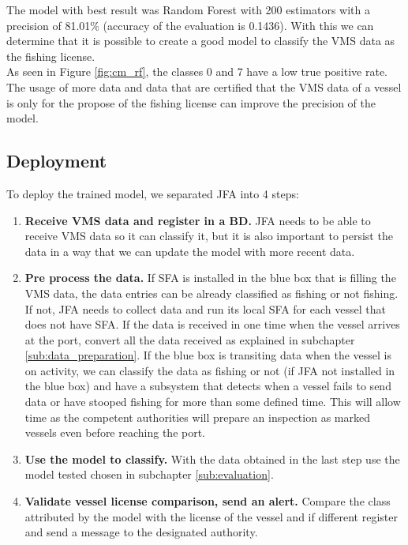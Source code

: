\newpage
The model with best result was Random Forest with 200 estimators with a precision of 81.01\% (accuracy of the evaluation is 0.1436).
With this we can determine that it is possible to create a good model to classify the VMS data as the fishing license. \\
As seen in Figure \ref{fig:cm_rf}, the classes 0 and 7 have a low true positive rate. The usage of more data and data that are certified that the VMS data of a vessel is only for the propose of the fishing license can improve the precision of the model.





\subsection{Deployment} %
\label{sub:deployment}

To deploy the trained model, we separated JFA into 4 steps:
\begin{enumerate}
\item \textbf{ Receive VMS data and register in a BD.} JFA needs to be able to receive VMS data so it can classify it, but it is also important to persist the data in a way that we can update the model with more recent data. 

\item \textbf{Pre process the data.} If SFA is installed in the blue box that is filling the VMS data, the data entries can be already classified as fishing or not fishing. If not, JFA needs to collect data and run its local SFA for each vessel that does not have SFA. If the data is received in one time when the vessel arrives at the port, convert all the data received as explained in subchapter \ref{sub:data_preparation}. If the blue box is transiting data when the vessel is on activity, we can classify the data as fishing or not (if JFA not installed in the blue box) and have a subsystem that detects when a vessel fails to send data or have stooped fishing for more than some defined time. This will allow time as the competent authorities will prepare an inspection as marked vessels even before reaching the port.\\

\item \textbf{Use the model to classify.} With the data obtained in the last step use the model tested chosen in subchapter \ref{sub:evaluation}.

\item \textbf{Validate vessel license comparison, send an alert.} Compare the class attributed by the model with the license of the vessel and if different register and send a message to the designated authority.

\end{enumerate}

